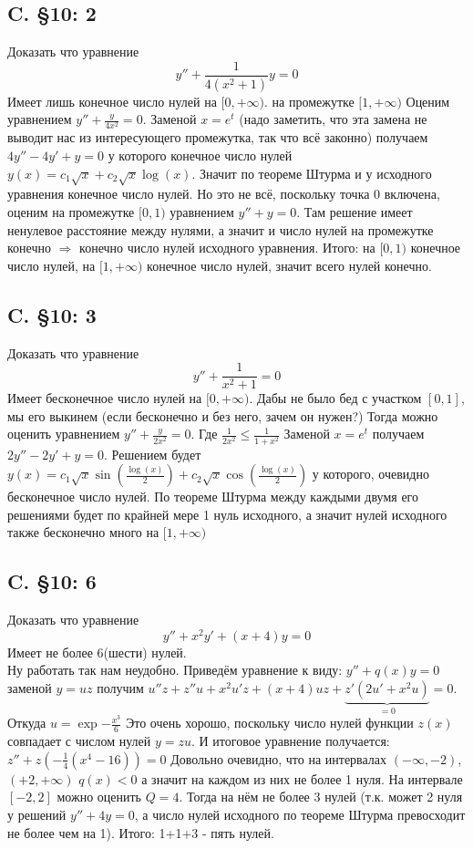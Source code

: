 \documentclass{article}
\begin{document}
\subsection{C. \S10: 2}
Доказать что уравнение 
\begin{equation}
    y''+\frac{1}{4(x^2+1)}y=0
\end{equation}
Имеет лишь конечное число нулей на $[0,+\infty)$. на промежутке $[1,+\infty)$ Оценим уравнением $y''+\frac{y}{4 x^2}=0$. Заменой $x=e^t$ (надо заметить, что эта замена не выводит нас из интересующего промежутка, так что всё законно) получаем $4y''-4y'+y=0$ у которого конечное число нулей $y(x) = c_1 \sqrt x + c_2 \sqrt x \log(x)$. Значит по теореме Штурма и у исходного уравнения конечное число нулей. Но это не всё, поскольку точка 0 включена, оценим на промежутке $[0,1)$ уравнением 
$y''+y=0$. Там решение имеет ненулевое расстояние между нулями, а значит и число нулей на промежутке конечно $\Rightarrow$ конечно число нулей исходного уравнения. Итого: на $[0,1)$ конечное число нулей, на $[1,+\infty)$ конечное число нулей, значит всего нулей конечно.
\subsection{C. \S10: 3}
Доказать что уравнение 
\begin{equation}
    y''+\frac{1}{x^2+1}=0
\end{equation}
Имеет бесконечное число нулей на $[0,+\infty)$. Дабы не было бед с участком $[0,1]$, мы его выкинем (если бесконечно и без него, зачем он нужен?) Тогда можно оценить уравнением $y''+\frac{y}{2x^2}=0$. Где $\frac{1}{2x^2} \leq \frac{1}{1+x^2}$ Заменой $x=e^t$ получаем $2y''-2y'+y=0$. Решением будет $y(x)=c_1 \sqrt{x} \sin \left(\frac{\log (x)}{2}\right)+c_2 \sqrt{x} \cos \left(\frac{\log (x)}{2}\right)$ у которого, очевидно бесконечное число нулей. По теореме Штурма между каждыми двумя его решениями будет по крайней мере 1 нуль исходного, а значит нулей исходного также бесконечно много на $[1,+\infty)$ 
\subsection{C. \S10: 6}
Доказать что уравнение 
\begin{equation}
    y''+x^2 y' +(x+4)y=0
\end{equation}
Имеет не более 6(шести) нулей.\\
Ну работать так нам неудобно. Приведём уравнение к виду: $y''+q(x)y=0$ заменой $y=u z$ получим $u''z+z''u+x^2u'z+(x+4) u z + \underbrace{z'(2u'+x^2u)}_{=0}=0$. Откуда $u=\exp{-\frac{x^3}{6}}$ Это очень хорошо, поскольку число нулей функции $z(x)$ совпадает с числом нулей $y=z u$. И итоговое уравнение получается: $z''+z(-\frac{1}{4} \left(x^4-16\right))=0$ Довольно очевидно, что на интервалах $(-\infty,-2)$, $(+2,+\infty)$ $q(x)<0$ а значит на каждом из них не более 1 нуля. На интервале $[-2,2]$ можно оценить $Q=4$. Тогда на нём не более 3 нулей (т.к. может 2  нуля у решений $y''+4y=0$, а число нулей исходного по теореме Штурма превосходит не более чем на 1). Итого: 1+1+3 - пять нулей.
\end{document}
